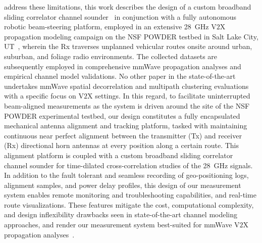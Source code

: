 \documentclass[10pt, twocolumn]{IEEEtran}
\renewcommand{\tabcolsep}{2pt}
\begin{document}
 address these limitations, this work describes the design of a custom broadband sliding correlator channel sounder~\cite{Sounder} in conjunction with a fully autonomous robotic beam-steering platform, employed in an extensive \SI{28}{\giga\hertz} V$2$X propagation modeling campaign on the NSF POWDER testbed in Salt Lake City, UT~\cite{POWDER, POWDER_RF}, wherein the Rx traverses unplanned vehicular routes onsite around urban, suburban, and foliage radio environments. The collected datasets are subsequently employed in comprehensive mmWave propagation analyses and empirical channel model validations. No other paper in the state-of-the-art undertakes mmWave spatial decorrelation and multipath clustering evaluations with a specific focus on V$2$X settings. In this regard, to facilitate uninterrupted beam-aligned measurements as the system is driven around the site of the NSF POWDER experimental testbed, our design constitutes a fully encapsulated mechanical antenna alignment and tracking platform, tasked with maintaining continuous near perfect alignment between the transmitter (Tx) and receiver (Rx) directional horn antennas at every position along a certain route. This alignment platform is coupled with a custom broadband sliding correlator channel sounder for time-dilated cross-correlation studies of the \SI{28}{\giga\hertz} signals. In addition to the fault tolerant and seamless recording of geo-positioning logs, alignment samples, and power delay profiles, this design of our measurement system enables remote monitoring and troubleshooting capabilities, and real-time route visualizations. These features mitigate the cost, computational complexity, and design inflexibility drawbacks seen in state-of-the-art channel modeling approaches, and render our measurement system best-suited for mmWave V$2$X propagation analyses~\cite{SPAVE_ICC}.\\
\renewcommand{\tabcolsep}{6pt}
\end{document}
